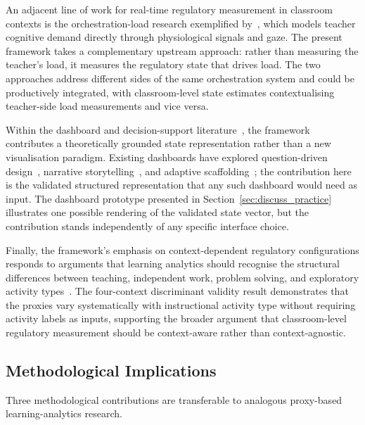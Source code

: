 \documentclass[preprint,12pt,authoryear]{elsarticle}
\begin{document}
An adjacent line of work for real-time regulatory measurement in classroom contexts is the orchestration-load research exemplified by~\citet{prieto2021}, which models teacher cognitive demand directly through physiological signals and gaze. The present framework takes a complementary upstream approach: rather than measuring the teacher's load, it measures the regulatory state that drives load. The two approaches address different sides of the same orchestration system and could be productively integrated, with classroom-level state estimates contextualising teacher-side load measurements and vice versa.

Within the dashboard and decision-support literature~\citep{molenaar2019, khosravi2021, pozdniakov2022, pozdniakov2023, han2021, lim2023}, the framework contributes a theoretically grounded state representation rather than a new visualisation paradigm. Existing dashboards have explored question-driven design~\citep{pozdniakov2022}, narrative storytelling~\citep{pozdniakov2023, martinez2022}, and adaptive scaffolding~\citep{lim2023}; the contribution here is the validated structured representation that any such dashboard would need as input. The dashboard prototype presented in Section~\ref{sec:discuss_practice} illustrates one possible rendering of the validated state vector, but the contribution stands independently of any specific interface choice.

Finally, the framework's emphasis on context-dependent regulatory configurations responds to arguments that learning analytics should recognise the structural differences between teaching, independent work, problem solving, and exploratory activity types~\citep{jovanovic2021, lockyer2013, viberg2020}. The four-context discriminant validity result demonstrates that the proxies vary systematically with instructional activity type without requiring activity labels as inputs, supporting the broader argument that classroom-level regulatory measurement should be context-aware rather than context-agnostic.

\subsection{Methodological Implications}
\label{sec:discuss_method}

Three methodological contributions are transferable to analogous proxy-based learning-analytics research.
\end{document}
